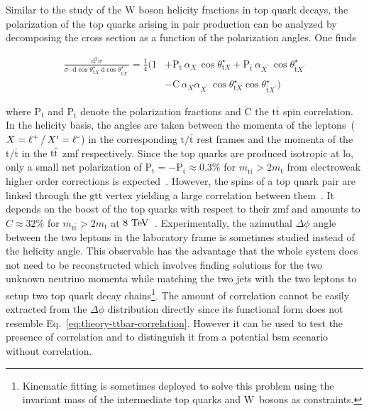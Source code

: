 Similar to the study of the $\mathrm{W}$ boson helicity fractions in top quark decays, the polarization of the top quarks arising in pair production can be analyzed by decomposing the \ttbar cross section as a function of the polarization angles. One finds

\begin{align}
\frac{\mathrm{d}^{2}\sigma}{\sigma\cdot\mathrm{d}\cos\theta_{\mathrm{t}X}^\star~\mathrm{d}\cos\theta_{\bar{\mathrm{t}}X^\prime}^\star}=\frac{1}{4}\Big(1&+\mathrm{P}_\mathrm{t}\,\alpha_{X}\,\cos\theta_{\mathrm{t}X}^\star+\mathrm{P}_{\bar{\mathrm{t}}}\,\alpha_{X^\prime}\,\cos\theta_{\bar{\mathrm{t}}X^\prime}^\star \nonumber \\
&-\mathrm{C}\,\alpha_{X}\alpha_{X^\prime}\,\cos\theta_{\mathrm{t}X}^\star \cos\theta_{\bar{\mathrm{t}}X^\prime}^\star\Big) \label{eq:theory-ttbar-correlation}
\end{align}

where $\mathrm{P}_\mathrm{t}$ and $\mathrm{P}_{\bar{\mathrm{t}}}$ denote the polarization fractions and $\mathrm{C}$ the $\mathrm{t\bar{t}}$ spin correlation. In the helicity basis, the angles are taken between the momenta of the leptons~($X=\ell^{\rmplus}\,/\,X^\prime=\ell^{\rmminus}$) in the corresponding $\mathrm{t}/\bar{\mathrm{t}}$ rest frames and the momenta of the $\mathrm{t}/\bar{\mathrm{t}}$ in the $\mathrm{t}\bar{\mathrm{t}}$ \gls{zmf} respectively. Since the top quarks are produced isotropic at \gls{lo}, only a small net polarization of $\mathrm{P}_\mathrm{t}=-\mathrm{P}_{\bar{\mathrm{t}}}\approx0.3\%$ for $m_\mathrm{t\bar{t}}>2m_\mathrm{t}$ from electroweak higher order corrections is expected~\cite{Bernreuther:2010ny,Bernreuther:2013aga}. However, the spins of a top quark pair are linked through the $\mathrm{g\mathrm{t}\bar{\mathrm{t}}}$ vertex yielding a large correlation between them~\cite{Mahlon:2010gw}. It depends on the boost of the top quarks with respect to their \gls{zmf} and amounts to $C\approx32\%$ for $m_\mathrm{t\bar{t}}>2m_\mathrm{t}$ at $8~\mathrm{TeV}$~\cite{Bernreuther:2013aga}. Experimentally, the azimuthal $\Delta\phi$ angle between the two leptons in the laboratory frame is sometimes studied instead of the helicity angle. This observable has the advantage that the whole \ttbar system does not need to be reconstructed which involves finding solutions for the two unknown neutrino momenta while matching the two jets with the two leptons to setup two top quark decay chains\footnote{Kinematic fitting is sometimes deployed to solve this problem using the invariant mass of the intermediate top quarks and $\mathrm{W}$~bosons as constraints.}. The amount of correlation cannot be easily extracted from the $\Delta\phi$ distribution directly since its functional form does not resemble Eq.~\ref{eq:theory-ttbar-correlation}. However it can be used to test the presence of \ttbar correlation and to distinguish it from a potential \gls{bsm} scenario without correlation.


